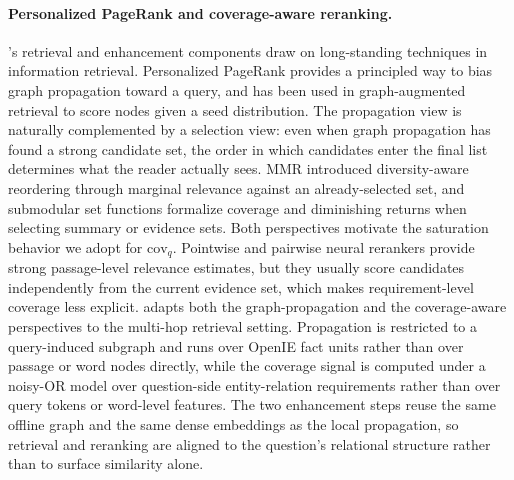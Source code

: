 \paragraph{Personalized PageRank and coverage-aware reranking.}
\methodname{}'s retrieval and enhancement components draw on
long-standing techniques in information retrieval. Personalized
PageRank \citep{haveliwala2002topic,jeh2003scaling} provides a
principled way to bias graph propagation toward a query, and has been
used in graph-augmented retrieval to score nodes given a seed
distribution. The propagation view is naturally complemented by a
selection view: even when graph propagation has found a strong
candidate set, the order in which candidates enter the final list
determines what the reader actually sees. MMR \citep{carbonell1998mmr}
introduced diversity-aware reordering through marginal relevance
against an already-selected set, and submodular set functions
\citep{lin2011submodular} formalize coverage and diminishing returns
when selecting summary or evidence sets. Both perspectives motivate the
saturation behavior we adopt for $\mathrm{cov}_q$. Pointwise and
pairwise neural rerankers provide strong passage-level relevance
estimates, but they usually score candidates independently from the
current evidence set, which makes requirement-level coverage less
explicit. \methodname{} adapts both the graph-propagation and the
coverage-aware perspectives to the multi-hop retrieval setting.
Propagation is restricted to a query-induced subgraph and runs over
OpenIE fact units rather than over passage or word nodes directly,
while the coverage signal is computed under a noisy-OR model over
question-side entity-relation requirements rather than over query
tokens or word-level features. The two enhancement steps reuse the
same offline graph and the same dense embeddings as the local
propagation, so retrieval and reranking are aligned to the question's
relational structure rather than to surface similarity alone.
